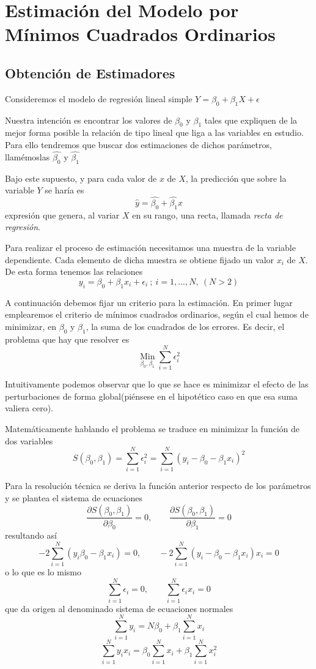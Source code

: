 \documentclass[10pt,a4paper]{book}
\begin{document}
	\section{Estimación del Modelo por Mínimos Cuadrados Ordinarios}
		\subsection{Obtención de Estimadores}
Consideremos el modelo de regresión lineal simple $Y=\beta_0 + \beta_1X + \epsilon$

Nuestra intención es encontrar los valores de $\beta_0$ y $\beta_1$ tales que expliquen de la mejor forma posible la relación de tipo lineal que liga a las variables en estudio. Para ello tendremos que buscar dos estimaciones de dichos parámetros, llamémoslas $\widehat{\beta_0}$ y $\widehat{\beta_1}$

Bajo este supuesto, y para cada valor de $x$ de $X$, la predicción que sobre la variable $Y$ se haría es $$\widehat{y}=\widehat{\beta_0}+\widehat{\beta_1}x$$ expresión que genera, al variar $X$ en su rango, una recta, llamada \textit{recta de regresión}.

Para realizar el proceso de estimación necesitamos una muestra de la variable dependiente. Cada elemento de dicha muestra se obtiene fijado un valor $x_i$ de $X$. De esta forma tenemos las relaciones $$y_i=\beta_0+\beta_1x_i+\epsilon_i\ ;\ i=1,...,N,\ (N > 2)$$

A continuación debemos fijar un criterio para la estimación. En primer lugar emplearemos el criterio de mínimos cuadrados ordinarios, según el cual hemos de minimizar, en $\beta_0$ y $\beta_1$, la suma de los cuadrados de los errores. Es decir, el problema que hay que resolver es  $$\operatorname*{Min}\limits_{\beta_0,\beta_1}\sum^N_{i=1}\epsilon^2_i$$ 

Intuitivamente podemos observar que lo que se hace es minimizar el efecto de las perturbaciones de forma global(piénsese en el hipotético caso en que esa suma valiera cero).

Matemáticamente hablando el problema se traduce en minimizar la función de dos variables $$ S(\beta_0,\beta_1)=\sum_{i=1}^N\epsilon_i^2=\sum_{i=1}^N(y_i-\beta_0-\beta_1x_i)^2$$

Para la resolución técnica se deriva la función anterior respecto de los parámetros y se plantea el sistema de ecuaciones  $$\frac{\partial S(\beta_0,\beta_1)}{\partial \beta_0}=0, \qquad \frac{\partial S(\beta_0,\beta_1)}{\partial \beta_1}=0$$ resultando así $$-2\sum^N_{i=1}(y_i\beta_0-\beta_1x_i)=0,\qquad -2\sum^N_{i=1}(y_i-\beta_0-\beta_1x_i)x_i=0$$ o lo que es lo mismo $$\sum^N_{i=1}\epsilon_i=0,\qquad \sum^N_{i=1}\epsilon_ix_i=0$$ que da origen al denominado sistema de ecuaciones normales $$\sum^N_{i=1}y_i=N\beta_0+\beta_1\sum^N_{i=1}x_i$$ $$\sum^N_{i=1}y_ix_i=\beta_0\sum^N_{i=1}x_i+\beta_1\sum^N_{i=1}x_i^2$$
\end{document}
